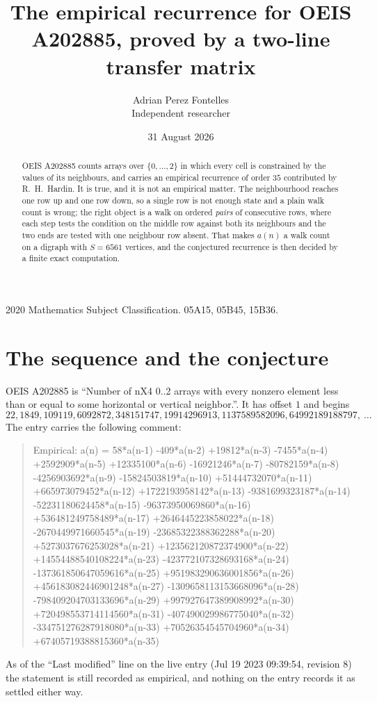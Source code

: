\documentclass[11pt,a4paper]{article}
\title{The empirical recurrence for OEIS A202885, proved by a two-line transfer matrix}
\author{Adrian Perez Fontelles\\ \small Independent researcher}
\date{31 August 2026}
\theoremstyle{plain}
\theoremstyle{definition}
\begin{document}
\maketitle

\begin{abstract}
OEIS A202885 counts arrays over $\{0,\dots,2\}$ in which every cell is constrained by the
values of its neighbours, and carries an empirical recurrence of order $35$ contributed
by R.~H.~Hardin. It is true, and it is not an empirical matter. The neighbourhood reaches one
row up and one row down, so a single row is not enough state and a plain walk count
is wrong; the right object is a walk on ordered \emph{pairs} of consecutive rows, where
each step tests the condition on the middle row against both its neighbours and the two
ends are tested with one neighbour row absent. That makes $a(n)$ a walk count on a digraph
with $S=6561$ vertices, and the conjectured recurrence is then decided by a finite exact
computation.
\end{abstract}

\noindent\small 2020 Mathematics Subject Classification. 05A15, 05B45, 15B36.\normalsize

\section{The sequence and the conjecture}

OEIS A202885 is ``Number of nX4 0..2 arrays with every nonzero element less than or equal to some horizontal or vertical neighbor.''. It has offset $1$ and begins
\[
22, 1849, 109119, 6092872, 348151747, 19914296913, 1137589582096, 64992189188797,\ \dots
\]
The entry carries the following comment:
\begin{quote}\small
Empirical: a(n) = 58*a(n-1) -409*a(n-2) +19812*a(n-3) -7455*a(n-4) +2592909*a(n-5) +12335100*a(n-6) -16921246*a(n-7) -80782159*a(n-8) -4256903692*a(n-9) -15824503819*a(n-10) +51444732070*a(n-11) +665973079452*a(n-12) +1722193958142*a(n-13) -9381699323187*a(n-14) -52231180624458*a(n-15) -96373950069860*a(n-16) +536481249758489*a(n-17) +2646445223858022*a(n-18) -2670449971660545*a(n-19) -23685322388362288*a(n-20) +5273037676253028*a(n-21) +123562120872374900*a(n-22) +14554488540108224*a(n-23) -423772107328693168*a(n-24) -137361850647059616*a(n-25) +951983290636001856*a(n-26) +456183082446901248*a(n-27) -1309658113153668096*a(n-28) -798409204703133696*a(n-29) +997927647389908992*a(n-30) +720498553714114560*a(n-31) -407490029986775040*a(n-32) -334751276287918080*a(n-33) +70526354545704960*a(n-34) +67405719388815360*a(n-35)
\end{quote}
As of the ``Last modified'' line on the live entry (Jul 19 2023 09:39:54, revision 8) the statement is
still recorded as empirical, and nothing on the entry records it as settled either way.
\end{document}
